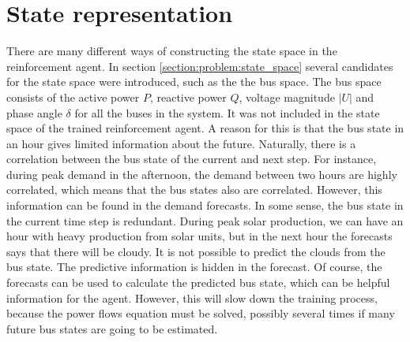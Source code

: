 \documentclass[class=book, crop=false, 11pt]{standalone}
\begin{document}
\section{State representation}
There are many different ways of constructing the state space in the reinforcement agent. In section \ref{section:problem:state_space} several candidates for the state space were introduced, such as the the bus space. The bus space consists of the active power $P$, reactive power $Q$, voltage magnitude $|U|$ and phase angle $\delta$ for all the buses in the system. It was not included in the state space of the trained reinforcement agent. A reason for this is that the bus state in an hour gives limited information about the future. Naturally, there is a correlation between the bus state of the current and next step. For instance, during peak demand in the afternoon, the demand between two hours are highly correlated, which means that the bus states also are correlated. However, this information can be found in the demand forecasts. In some sense, the bus state in the current time step is redundant. During peak solar production, we can have an hour with heavy production from solar units, but in the next hour the forecasts says that there will be cloudy. It is not possible to predict the clouds from the bus state. The predictive information is hidden in the forecast. Of course, the forecasts can be used to calculate the predicted bus state, which can be helpful information for the agent. However, this will slow down the training process, because the power flows equation must be solved, possibly several times if many future bus states are going to be estimated. 
\end{document}
